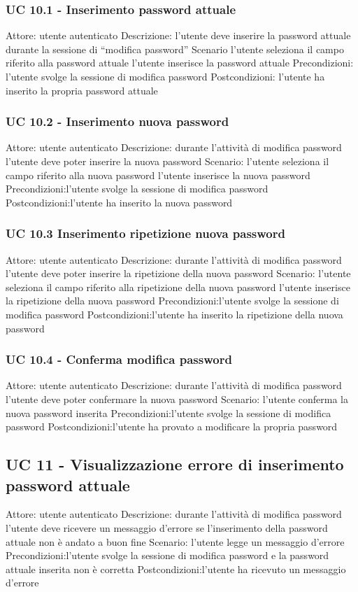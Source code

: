 \subsubsection{UC 10.1 - Inserimento password attuale} 
Attore: utente autenticato
Descrizione: l’utente deve inserire la password attuale durante la sessione di “modifica password”
Scenario
l’utente seleziona il campo riferito alla password attuale
l’utente inserisce la password attuale
Precondizioni: l’utente svolge la sessione di modifica password
Postcondizioni: l’utente ha inserito la propria password attuale

\subsubsection{UC 10.2 - Inserimento nuova password}
Attore: utente autenticato
Descrizione: durante l’attività di modifica password l’utente deve poter inserire la nuova password
Scenario: 
l’utente seleziona il campo riferito alla nuova password
l’utente inserisce la nuova password 
Precondizioni:l’utente svolge la sessione di modifica password
Postcondizioni:l’utente ha inserito la nuova password 

\subsubsection{UC 10.3 Inserimento ripetizione nuova password}
Attore: utente autenticato
Descrizione: durante l’attività di modifica password l’utente deve poter inserire la ripetizione della nuova password
Scenario: 
l’utente seleziona il campo riferito alla ripetizione della nuova password
l’utente inserisce la ripetizione della nuova password 
Precondizioni:l’utente svolge la sessione di modifica password
Postcondizioni:l’utente ha inserito la ripetizione della nuova password 

\subsubsection{UC 10.4 - Conferma modifica password}
Attore: utente autenticato
Descrizione: durante l’attività di modifica password l’utente deve poter confermare la nuova password
Scenario: l’utente conferma la nuova password inserita
Precondizioni:l’utente svolge la sessione di modifica password
Postcondizioni:l’utente ha provato a modificare la propria password

\subsection{UC 11 - Visualizzazione errore di inserimento password attuale}
Attore: utente autenticato
Descrizione: durante l’attività di modifica password l’utente deve ricevere un messaggio d’errore se l'inserimento della password attuale non è andato a buon fine
Scenario: l’utente legge un messaggio d’errore
Precondizioni:l’utente svolge la sessione di modifica password e la password attuale inserita non è corretta
Postcondizioni:l’utente ha ricevuto un messaggio d’errore

